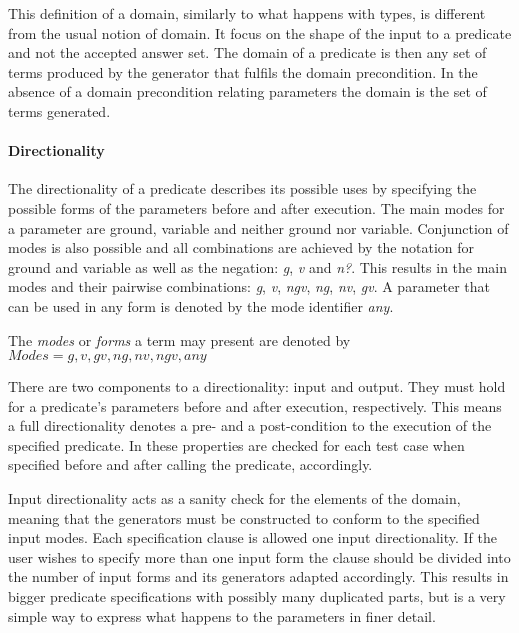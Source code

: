 This definition of a domain, similarly to what happens with types, is
different from the usual notion of domain.
%
It focus on the shape of the input to a predicate and not the accepted
answer set.
%
The \plqc{} domain of a predicate is then any set of terms produced by
the generator that fulfils the domain precondition.
%
In the absence of a domain precondition relating parameters the domain
is the set of terms generated.


\paragraph{\bf Directionality}

The directionality of a predicate describes its possible uses by
specifying the possible forms of the parameters before and after
execution.
%
The main modes for a parameter are ground, variable and neither ground
nor variable.
%
Conjunction of modes is also possible and all combinations are achieved
by the notation for ground and variable as well as the negation:
\emph{g}, \emph{v} and \emph{n?}.
%
This results in the main modes and their pairwise combinations: \emph{g},
\emph{v}, \emph{ngv},  \emph{ng}, \emph{nv}, \emph{gv}.
%
A parameter that can be used in any form is denoted by the mode
identifier \emph{any}.


\begin{definition}
\label{def:modes}
The \emph{modes} or \emph{forms} a term may present are denoted by\\
 $Modes = {g, v, gv, ng, nv, ngv, any}$
\end{definition}


There are two components to a directionality: input and output.
%
They must hold for a predicate's parameters before and after execution,
respectively.
%
This means a full directionality denotes a pre- and a post-condition to
the execution of the specified predicate.
%
In \plqc{} these properties are checked for each test case when
specified before and after calling the predicate, accordingly.


Input directionality acts as a sanity check for the elements of the
domain, meaning that the generators must be constructed to conform to the
specified input modes.
%
Each specification clause is allowed one input directionality.
%
If the user wishes to specify more than one input form the clause should
be divided into the number of input forms and its generators adapted
accordingly.
%
This results in bigger predicate specifications with possibly many
duplicated parts, but is a very simple way to express what happens to the
parameters in finer detail.


